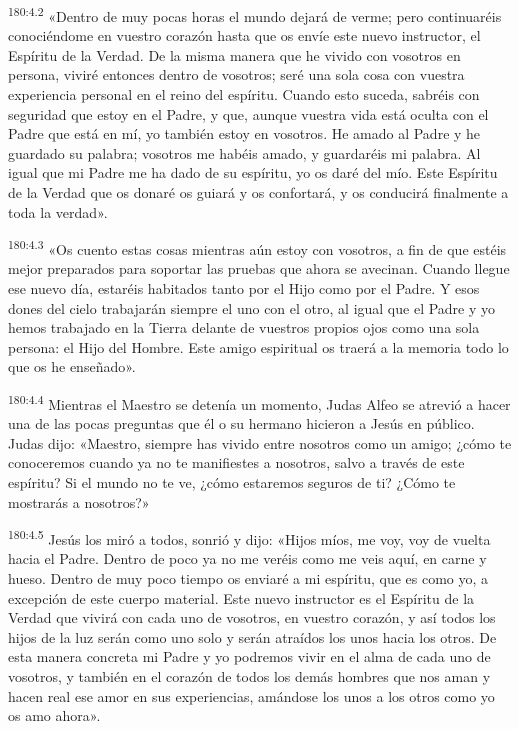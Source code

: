 \par 
\textsuperscript{180:4.2} «Dentro de muy pocas horas el mundo dejará de verme; pero continuaréis conociéndome en vuestro corazón hasta que os envíe este nuevo instructor, el Espíritu de la Verdad. De la misma manera que he vivido con vosotros en persona, viviré entonces dentro de vosotros; seré una sola cosa con vuestra experiencia personal en el reino del espíritu. Cuando esto suceda, sabréis con seguridad que estoy en el Padre, y que, aunque vuestra vida está oculta con el Padre que está en mí, yo también estoy en vosotros. He amado al Padre y he guardado su palabra; vosotros me habéis amado, y guardaréis mi palabra. Al igual que mi Padre me ha dado de su espíritu, yo os daré del mío. Este Espíritu de la Verdad que os donaré os guiará y os confortará, y os conducirá finalmente a toda la verdad».

\par 
\textsuperscript{180:4.3} «Os cuento estas cosas mientras aún estoy con vosotros, a fin de que estéis mejor preparados para soportar las pruebas que ahora se avecinan. Cuando llegue ese nuevo día, estaréis habitados tanto por el Hijo como por el Padre. Y esos dones del cielo trabajarán siempre el uno con el otro, al igual que el Padre y yo hemos trabajado en la Tierra delante de vuestros propios ojos como una sola persona: el Hijo del Hombre. Este amigo espiritual os traerá a la memoria todo lo que os he enseñado».

\par 
\textsuperscript{180:4.4} Mientras el Maestro se detenía un momento, Judas Alfeo se atrevió a hacer una de las pocas preguntas que él o su hermano hicieron a Jesús en público. Judas dijo: «Maestro, siempre has vivido entre nosotros como un amigo; ¿cómo te conoceremos cuando ya no te manifiestes a nosotros, salvo a través de este espíritu? Si el mundo no te ve, ¿cómo estaremos seguros de ti? ¿Cómo te mostrarás a nosotros?»

\par 
\textsuperscript{180:4.5} Jesús los miró a todos, sonrió y dijo: «Hijos míos, me voy, voy de vuelta hacia el Padre. Dentro de poco ya no me veréis como me veis aquí, en carne y hueso. Dentro de muy poco tiempo os enviaré a mi espíritu, que es como yo, a excepción de este cuerpo material. Este nuevo instructor es el Espíritu de la Verdad que vivirá con cada uno de vosotros, en vuestro corazón, y así todos los hijos de la luz serán como uno solo y serán atraídos los unos hacia los otros. De esta manera concreta mi Padre y yo podremos vivir en el alma de cada uno de vosotros, y también en el corazón de todos los demás hombres que nos aman y hacen real ese amor en sus experiencias, amándose los unos a los otros como yo os amo ahora».

